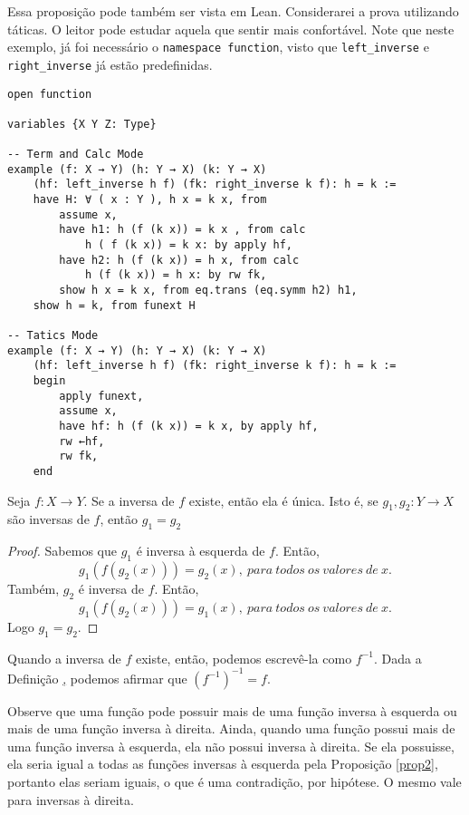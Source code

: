 Essa proposição pode também ser vista em Lean. Considerarei a prova utilizando táticas. O leitor pode estudar
aquela que sentir mais confortável. Note que neste exemplo, já foi necessário o \lstinline{namespace function},
visto que \lstinline{left_inverse} e \lstinline{right_inverse} já estão predefinidas.

\begin{lstlisting}
open function

variables {X Y Z: Type}

-- Term and Calc Mode
example (f: X → Y) (h: Y → X) (k: Y → X)
    (hf: left_inverse h f) (fk: right_inverse k f): h = k :=
    have H: ∀ ( x : Y ), h x = k x, from
        assume x,
        have h1: h (f (k x)) = k x , from calc
            h ( f (k x)) = k x: by apply hf,
        have h2: h (f (k x)) = h x, from calc
            h (f (k x)) = h x: by rw fk,
        show h x = k x, from eq.trans (eq.symm h2) h1,
    show h = k, from funext H

-- Tatics Mode
example (f: X → Y) (h: Y → X) (k: Y → X)
    (hf: left_inverse h f) (fk: right_inverse k f): h = k :=
    begin
        apply funext,
        assume x,
        have hf: h (f (k x)) = k x, by apply hf,
        rw ←hf,
        rw fk,
    end
\end{lstlisting}

\begin{theorem}
    \label{prop3}
    Seja $f: X \to Y$. Se a inversa de $f$ existe, então ela é única. Isto é, se $g_1, g_2: Y \to X$ são inversas
    de $f$, então $g_1 = g_2$
\end{theorem}
\begin{proof}
    Sabemos que $g_1$ é inversa à esquerda de $f$. Então,
    $$g_1(f(g_2(x))) = g_2(x), ~para~todos~os~valores~de~x.$$
    Também, $g_2$ é inversa de $f$. Então,
    $$g_1(f(g_2(x))) = g_1(x), ~para~todos~os~valores~de~x.$$ Logo $g_1 = g_2$.
\end{proof}

Quando a inversa de $f$ existe, então, podemos escrevê-la como $f^{-1}$. Dada a Definição \hyperlink{def4},
podemos afirmar que $(f^{-1})^{-1} = f$.

Observe que uma função pode possuir mais de uma função inversa à esquerda ou mais de uma função inversa
à direita. Ainda, quando uma função possui mais de uma função inversa à esquerda, ela não possui inversa
à direita. Se ela possuisse, ela seria igual a todas as funções inversas à esquerda pela Proposição \ref{prop2},
portanto elas seriam iguais, o que é uma contradição, por hipótese. O mesmo vale para inversas à direita.

